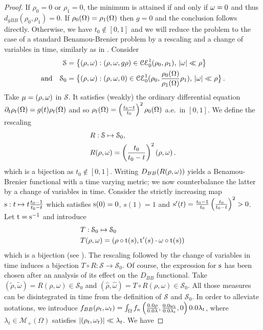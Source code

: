 \begin{proof}
If $\rho_0=0$ or $\rho_1=0$, the minimum is attained if and only if $\omega=0$ and thus $d_{gBB}(\rho_0,\rho_1)=0$. If $\rho_0(\Omega)=\rho_1(\Omega)$ then $g = 0$ and the conclusion follows directly.
%
Otherwise, we have $t_0 \notin [0,1]$ and we will reduce the problem to the case of a standard Benamou-Brenier problem by a rescaling and a change of variables in time, similarly as in \cite[Proposition 7]{lombardi2013eulerian}. Consider 
\begin{align*}
\mathcal{S} &= \left\{ (\rho,\omega) : (\rho,\omega,g\rho) \in \mathcal{CE}_0^1(\rho_0,\rho_1), \, |\omega| \ll \rho \right\} \\
\text{and} \quad
\mathcal{S}_0 &= \big\{ (\rho,\omega) : (\rho, \omega, 0) \in  \mathcal{CE}_0^1(\rho_0,\frac{\rho_0(\Omega)}{\rho_1(\Omega)}\rho_1),  \, |\omega| \ll \rho  \big\}\, .
\end{align*}
%
Take $\mu=(\rho,\omega)$ in $\mathcal{S}$. It satisfies (weakly) the ordinary differential equation $\partial_t \rho_t(\Omega) = g(t) \rho_t(\Omega)$ and so $\rho_t(\Omega) = \left( \frac{t_0-t}{t_0}\right)^2 \rho_0(\Omega)$ a.e.\ in $[0,1]$. We define the rescaling
\begin{align*}& R : \mathcal{S} \mapsto  \mathcal{S}_0, \\
& R(\rho,\omega) =  \left( \frac{t_0}{t_0-t}\right)^2 (\rho,\omega) \, .
\end{align*}
which is a bijection as $t_0 \notin [0,1]$.
%
Writing $D_{BB}(R(\rho,\omega))$ yields a Benamou-Brenier functional with a time varying metric;  we now counterbalance the latter by a change of variables in time.
%
Consider the strictly increasing map $\mathrm{s}: t \mapsto t\frac{t_0-1}{t_0-t}$ which satisfies $\mathrm{s}(0)=0$, $s(1)=1$ and $\mathrm{s}'(t)=\frac{t_0-1}{t_0}\left( \frac{t_0}{t_0-t} \right)^2>0$. Let $\mathrm{t} = \mathrm{s}^{-1}$ and introduce
\begin{align*}& T: \mathcal{S}_0 \mapsto  \mathcal{S}_0 \\
&T(\rho,\omega) = (\rho \circ \mathrm{t}(s), \mathrm{t}'(s) \cdot \omega \circ \mathrm{t}(s))\,
\end{align*}
which is a bijection (see \cite[Lemma 8.1.3]{ambrosio2006gradient}).
The rescaling followed by the change of variables in time induces a bijection $T\circ R : \mathcal{S} \to \mathcal{S}_0$. Of course, the expression for $\mathrm{s}$ has been chosen after an analysis of its effect on the $D_{BB}$ functional. 
%
Take $(\tilde{\rho},\tilde{\omega}) = R(\rho,\omega) \in \mathcal{S}_0 $ and $(\hat{\rho},\hat{\omega}) = T \circ R(\rho,\omega) \in \mathcal{S}_0 $. All those measures can be disintegrated in time from the definition of $\mathcal{S}$ and $\mathcal{S}_0$. In order to alleviate notations, we introduce $f_{BB}(\rho_t,\M_t)=\int_{\Omega} \fonc \left(\frac{\d \rho}{\d \lambda}, \frac{\d \M_t}{\d \lambda_t},0 \right) \d \lambda_t $,  where $\lambda_t \in \mathcal{M}_+(\Omega)$ satisfies $|(\rho_t, \omega_t)|\ll \lambda_t$. We have

\end{proof}
